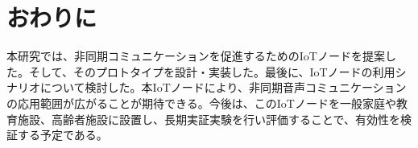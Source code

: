 \documentclass[submit,techrep,noauthor]{ipsj}
\begin{document}
\section{おわりに}
本研究では、非同期コミュニケーションを促進するためのIoTノードを提案した。そして、そのプロトタイプを設計・実装した。最後に、IoTノードの利用シナリオについて検討した。本IoTノードにより、非同期音声コミュニケーションの応用範囲が広がることが期待できる。今後は、このIoTノードを一般家庭や教育施設、高齢者施設に設置し、長期実証実験を行い評価することで、有効性を検証する予定である。



 
\end{document}
